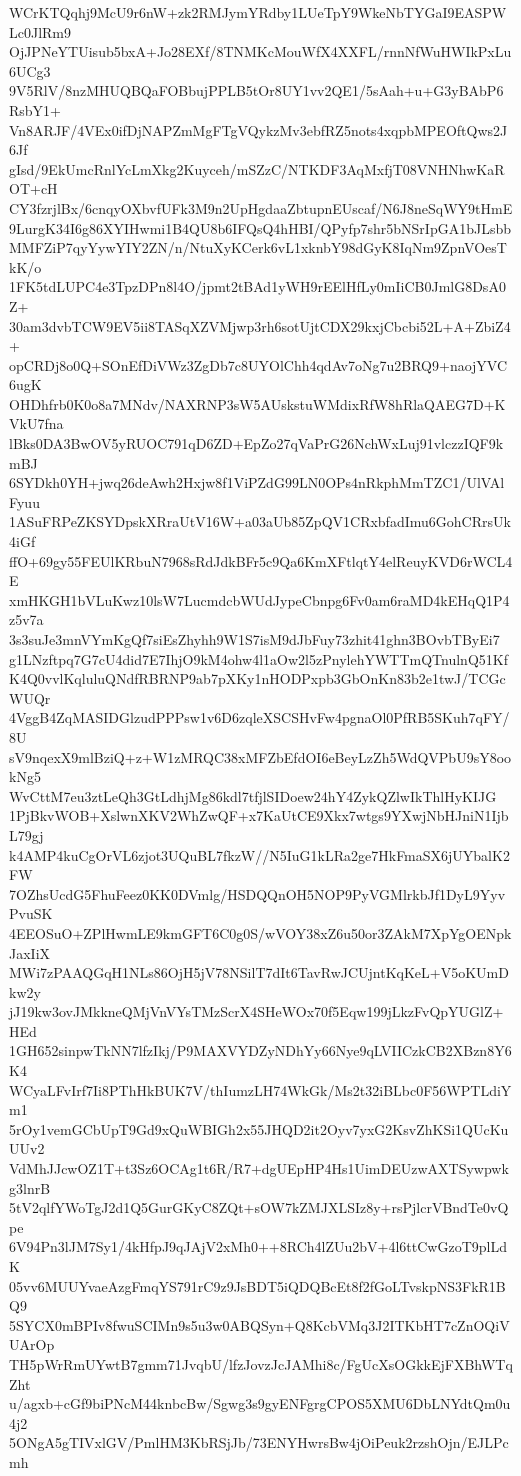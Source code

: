 WCrKTQqhj9McU9r6nW+zk2RMJymYRdby1LUeTpY9WkeNbTYGaI9EASPWLc0JlRm9
OjJPNeYTUisub5bxA+Jo28EXf/8TNMKcMouWfX4XXFL/rnnNfWuHWIkPxLu6UCg3
9V5RlV/8nzMHUQBQaFOBbujPPLB5tOr8UY1vv2QE1/5sAah+u+G3yBAbP6RsbY1+
Vn8ARJF/4VEx0ifDjNAPZmMgFTgVQykzMv3ebfRZ5nots4xqpbMPEOftQws2J6Jf
gIsd/9EkUmcRnlYcLmXkg2Kuyceh/mSZzC/NTKDF3AqMxfjT08VNHNhwKaROT+cH
CY3fzrjlBx/6cnqyOXbvfUFk3M9n2UpHgdaaZbtupnEUscaf/N6J8neSqWY9tHmE
9LurgK34I6g86XYIHwmi1B4QU8b6IFQsQ4hHBI/QPyfp7shr5bNSrIpGA1bJLsbb
MMFZiP7qyYywYIY2ZN/n/NtuXyKCerk6vL1xknbY98dGyK8IqNm9ZpnVOesTkK/o
1FK5tdLUPC4e3TpzDPn8l4O/jpmt2tBAd1yWH9rEElHfLy0mIiCB0JmlG8DsA0Z+
30am3dvbTCW9EV5ii8TASqXZVMjwp3rh6sotUjtCDX29kxjCbcbi52L+A+ZbiZ4+
opCRDj8o0Q+SOnEfDiVWz3ZgDb7c8UYOlChh4qdAv7oNg7u2BRQ9+naojYVC6ugK
OHDhfrb0K0o8a7MNdv/NAXRNP3sW5AUskstuWMdixRfW8hRlaQAEG7D+KVkU7fna
lBks0DA3BwOV5yRUOC791qD6ZD+EpZo27qVaPrG26NchWxLuj91vlczzIQF9kmBJ
6SYDkh0YH+jwq26deAwh2Hxjw8f1ViPZdG99LN0OPs4nRkphMmTZC1/UlVAlFyuu
1ASuFRPeZKSYDpskXRraUtV16W+a03aUb85ZpQV1CRxbfadImu6GohCRrsUk4iGf
ffO+69gy55FEUlKRbuN7968sRdJdkBFr5c9Qa6KmXFtlqtY4elReuyKVD6rWCL4E
xmHKGH1bVLuKwz10lsW7LucmdcbWUdJypeCbnpg6Fv0am6raMD4kEHqQ1P4z5v7a
3s3suJe3mnVYmKgQf7siEsZhyhh9W1S7isM9dJbFuy73zhit41ghn3BOvbTByEi7
g1LNzftpq7G7cU4did7E7IhjO9kM4ohw4l1aOw2l5zPnylehYWTTmQTnulnQ51Kf
K4Q0vvlKqluluQNdfRBRNP9ab7pXKy1nHODPxpb3GbOnKn83b2e1twJ/TCGcWUQr
4VggB4ZqMASIDGlzudPPPsw1v6D6zqleXSCSHvFw4pgnaOl0PfRB5SKuh7qFY/8U
sV9nqexX9mlBziQ+z+W1zMRQC38xMFZbEfdOI6eBeyLzZh5WdQVPbU9sY8ookNg5
WvCttM7eu3ztLeQh3GtLdhjMg86kdl7tfjlSIDoew24hY4ZykQZlwIkThlHyKIJG
1PjBkvWOB+XslwnXKV2WhZwQF+x7KaUtCE9Xkx7wtgs9YXwjNbHJniN1IjbL79gj
k4AMP4kuCgOrVL6zjot3UQuBL7fkzW//N5IuG1kLRa2ge7HkFmaSX6jUYbalK2FW
7OZhsUcdG5FhuFeez0KK0DVmlg/HSDQQnOH5NOP9PyVGMlrkbJf1DyL9YyvPvuSK
4EEOSuO+ZPlHwmLE9kmGFT6C0g0S/wVOY38xZ6u50or3ZAkM7XpYgOENpkJaxIiX
MWi7zPAAQGqH1NLs86OjH5jV78NSilT7dIt6TavRwJCUjntKqKeL+V5oKUmDkw2y
jJ19kw3ovJMkkneQMjVnVYsTMzScrX4SHeWOx70f5Eqw199jLkzFvQpYUGlZ+HEd
1GH652sinpwTkNN7lfzIkj/P9MAXVYDZyNDhYy66Nye9qLVIICzkCB2XBzn8Y6K4
WCyaLFvIrf7Ii8PThHkBUK7V/thIumzLH74WkGk/Ms2t32iBLbc0F56WPTLdiYm1
5rOy1vemGCbUpT9Gd9xQuWBIGh2x55JHQD2it2Oyv7yxG2KsvZhKSi1QUcKuUUv2
VdMhJJcwOZ1T+t3Sz6OCAg1t6R/R7+dgUEpHP4Hs1UimDEUzwAXTSywpwkg3lnrB
5tV2qlfYWoTgJ2d1Q5GurGKyC8ZQt+sOW7kZMJXLSIz8y+rsPjlcrVBndTe0vQpe
6V94Pn3lJM7Sy1/4kHfpJ9qJAjV2xMh0++8RCh4lZUu2bV+4l6ttCwGzoT9plLdK
05vv6MUUYvaeAzgFmqYS791rC9z9JsBDT5iQDQBcEt8f2fGoLTvskpNS3FkR1BQ9
5SYCX0mBPIv8fwuSCIMn9s5u3w0ABQSyn+Q8KcbVMq3J2ITKbHT7cZnOQiVUArOp
TH5pWrRmUYwtB7gmm71JvqbU/lfzJovzJcJAMhi8c/FgUcXsOGkkEjFXBhWTqZht
u/agxb+cGf9biPNcM44knbcBw/Sgwg3s9gyENFgrgCPOS5XMU6DbLNYdtQm0u4j2
5ONgA5gTIVxlGV/PmlHM3KbRSjJb/73ENYHwrsBw4jOiPeuk2rzshOjn/EJLPcmh
